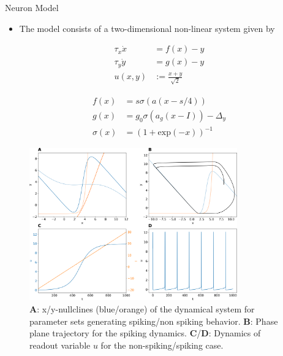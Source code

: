 \documentclass{beamer}
\begin{document}
\begin{frame}[t]
\begin{columns}[t]
\begin{column}{.45\textwidth}
\begin{myblock}{Neuron Model}
\begin{itemize}
\item The model consists of a two-dimensional non-linear system given by
\end{itemize}
\begin{minipage}[t]{.5\linewidth}
\begin{align*}
\tau_x \dot{x} &= f(x) - y  \\ 
\tau_y \dot{y} &= g(x) - y \\
u(x,y) &:= \frac{x+y}{\sqrt{2}}
\end{align*}
\end{minipage}%
\begin{minipage}[t]{.5\linewidth}
\begin{align*}
f(x) &= s \sigma \left(a\left(x-s/4\right)\right)  \\
g(x) &= g_0 \sigma\left(a_g\left(x-I\right)\right) - \Delta_y \\
\sigma(x) &= \left(1+\mathrm{exp}(-x)\right)^{-1}
\end{align*}
\end{minipage}
\begin{figure}
\centering
\includegraphics[width=0.8\textwidth]{../figures/graphics/dynamics_combined_figure.png}
\caption{\textbf{A}: x/y-nullclines (blue/orange) of the dynamical system for parameter sets generating spiking/non spiking behavior. \textbf{B}: Phase plane trajectory for the spiking dynamics. \textbf{C}/\textbf{D}: Dynamics of readout variable $u$ for the non-spiking/spiking case.}
\label{fig:dynamics_illustr}
\end{figure}
\end{myblock}


\end{column}
\end{columns}
\end{frame}
\end{document}
